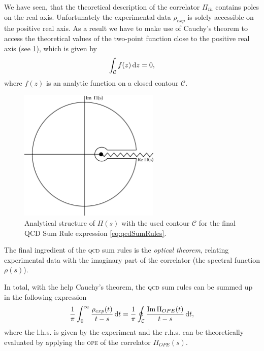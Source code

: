 \documentclass[../../index.tex]{subfiles}
\begin{document}
We have seen, that the theoretical description of the correlator $\Pi_{th}$
contains poles on the real axis. Unfortunately the experimental data $\rho_{exp}$ is
solely accessible on the positive real axis. As a result we have to make use of Cauchy's
theorem to access the theoretical values of the two-point function close to the
positive real axis (see \cref{fig:correlatorComplexContour}), which is given by
\begin{equation}
  \label{eq:cauchysTheorem}
  \int_{\mathcal{C}} f(z) \dif z = 0,
\end{equation}
where $f(z)$ is an analytic function on a closed contour $\mathcal{C}$.
\begin{figure}[h]
  \centering
  \label{fig:correlatorComplexContour}
  \includegraphics[width=0.6\textwidth]{./images/correlatorComplexContour.eps}
  \caption{Analytical structure of $\Pi(s)$ with the used contour $\mathcal{C}$
    for the final QCD Sum Rule expression \cref{eq:qcdSumRules}.}
\end{figure}

The final ingredient of the \textsc{qcd} sum rules is the \textit{optical
  theorem}, relating experimental data with the imaginary part of the correlator
(the spectral function $\rho(s)$).

In total, with the help Cauchy's theorem, the \textsc{qcd} sum rules can be
summed up in the following expression
\begin{equation}
  \label{eq:qcdSumRules}
  \frac{1}{\pi}\int_0^\infty \frac{\rho_{exp}(t)}{t - s}\dif t = \frac{1}{\pi} \oint_{\mathcal{C}} \frac{\Ima \Pi_{OPE}(t)}{t -s}\dif t,
\end{equation}
where the l.h.s. is given by the experiment and the r.h.s. can be theoretically
evaluated by applying the \textsc{ope} of the correlator $\Pi_{OPE}(s)$.
\end{document}

